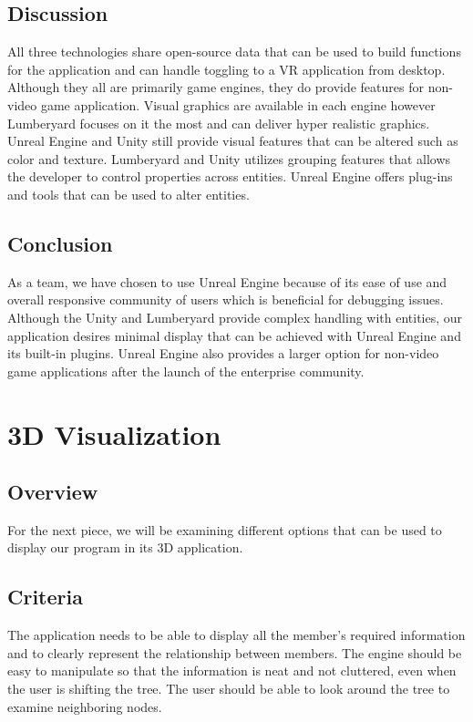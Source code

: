 \documentclass[onecolumn, draftclsnofoot,10pt, compsoc]{IEEEtran}
\begin{document}
\subsection{Discussion}
\begin{singlespace}
All three technologies share open-source data that can be used to build functions for the application and can handle toggling to a VR application from desktop. Although they all are primarily game engines, they do provide features for non-video game application. Visual graphics are available in each engine however Lumberyard focuses on it the most and can deliver hyper realistic graphics. Unreal Engine and Unity still provide visual features that can be altered such as color and texture. Lumberyard and Unity utilizes grouping features that allows the developer to control properties across entities. Unreal Engine offers plug-ins and tools that can be used to alter entities.
\end{singlespace}

\subsection{Conclusion}
\begin{singlespace}
As a team, we have chosen to use Unreal Engine because of its ease of use and overall responsive community of users which is beneficial for debugging issues. Although the Unity and Lumberyard provide complex handling with entities, our application desires minimal display that can be achieved with Unreal Engine and its built-in plugins. Unreal Engine also provides a larger option for non-video game applications after the launch of the enterprise community.   
\end{singlespace}

\section{3D Visualization}
\subsection{Overview}
\begin{singlespace}
For the next piece, we will be examining different options that can be used to display our program in its 3D application. 
\end{singlespace}

\subsection{Criteria}
\begin{singlespace}
The application needs to be able to display all the member’s required information and to clearly represent the relationship between members. The engine should be easy to manipulate so that the information is neat and not cluttered, even when the user is shifting the tree. The user should be able to look around the tree to examine neighboring nodes.  
\end{singlespace}
\end{document}
